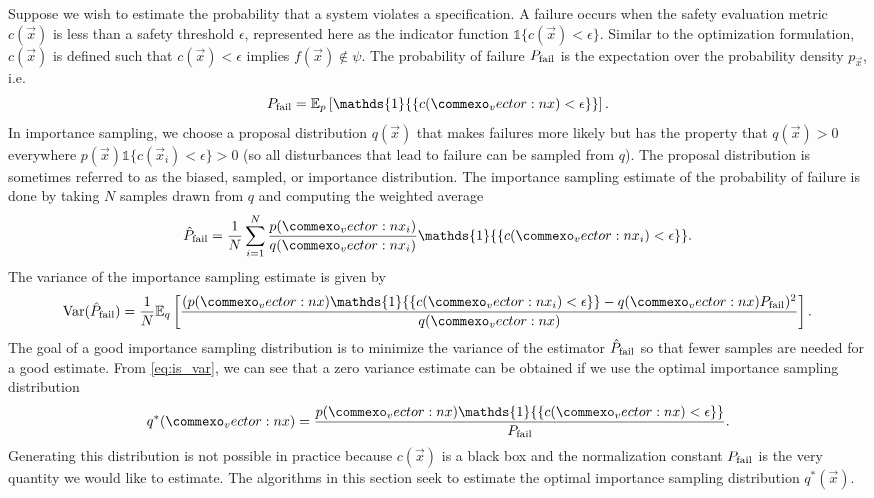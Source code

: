 Suppose we wish to estimate the probability that a system violates a specification. A failure occurs when the safety evaluation metric $c(\vec{x})$ is less than a safety threshold $\epsilon$, represented here as the indicator function $\mathds{1}{\{ c(\vec{x}) < \epsilon \}}$. Similar to the optimization formulation, $c(\vec{x})$ is defined such that $c(\vec{x}) < \epsilon$ implies $f(\vec{x}) \not \in \psi$. The probability of failure $P_{\rm fail}$ is the expectation over the probability density $p_{\vec{x}}$, i.e.
\begin{equation}
    P_{\rm fail} = \mathbb{E}_{p}\left[ \mathds{1}{\{ c(\vec{x}) < \epsilon \}} \right] \text{.}
\end{equation} 
In importance sampling, we choose a proposal distribution $q(\vec{x})$ that makes failures more likely but has the property that $q(\vec{x}) > 0$ everywhere $p(\vec{x})\mathds{1}\{ c(\vec{x}_i) < \epsilon \} > 0$ (so all disturbances that lead to failure can be sampled from $q$). The proposal distribution is sometimes referred to as the biased, sampled, or importance distribution. The importance sampling estimate of the probability of failure is done by taking $N$ samples drawn from $q$ and computing the weighted average
\begin{equation}
    \hat{P}_{\rm fail} = \frac{1}{N} \sum_{i=1}^N \frac{p(\vec{x}_i)}{q(\vec{x}_i)} \mathds{1}{\{ c(\vec{x}_i) < \epsilon \}} \text{.} \label{eq:is_est}
\end{equation}
The variance of the importance sampling estimate is given by 
\begin{equation}
    {\rm Var}(\hat{P}_{\rm fail}  ) = \frac{1}{N} \mathbb{E}_q \left[ \frac{(p(\vec{x})\mathds{1}{\{ c(\vec{x}_i) < \epsilon \}}  - q(\vec{x})P_{\rm fail})^2}{q(\vec{x})} \right] \text{.} \label{eq:is_var}
\end{equation}
The goal of a good importance sampling distribution is to minimize the variance of the estimator $\hat{P}_{\rm fail} $ so that fewer samples are needed for a good estimate. From \cref{eq:is_var}, we can see that a zero variance estimate can be obtained if we use the optimal importance sampling distribution
\begin{equation}
    q^*(\vec{x}) = \frac{p(\vec{x}) \mathds{1}{\{ c(\vec{x}) < \epsilon \}}} {P_{\rm fail}} \text{.}
\end{equation}
Generating this distribution is not possible in practice because $c(\vec{x})$ is a black box and the normalization constant $P_{\rm fail}$ is the very quantity we would like to estimate. The algorithms in this section seek to estimate the optimal importance sampling distribution $q^*(\vec{x})$.

